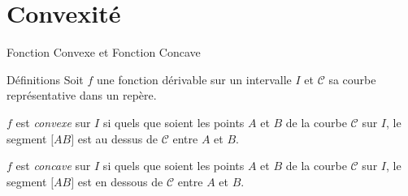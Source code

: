 \documentclass{coursbook}
\begin{document}
    \chapter{Convexité}

    \begin{Gpartie}{Fonction Convexe et Fonction Concave} 
        \begin{Spartie}{Définitions} 
            Soit $f$ une fonction dérivable sur un intervalle $I$ et $\mathcal{C}$ sa courbe représentative dans un repère.

            $f$ est \emph{convexe} sur $I$ si quels que soient les points $A$ et $B$ de la courbe $\mathcal{C}$ sur $I$, le segment $\big[AB\big]$ est au dessus de $\mathcal{C}$ entre $A$ et $B$.

            $f$ est \emph{concave} sur $I$ si quels que soient les points $A$ et $B$ de la courbe $\mathcal{C}$ sur $I$, le segment $\big[AB\big]$ est en dessous de $\mathcal{C}$ entre $A$ et $B$.


\end{Spartie}
\end{Gpartie}
\end{document}
